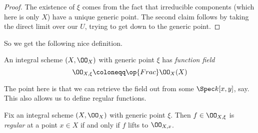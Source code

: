 \documentclass[../notes.tex]{subfiles}
\begin{document}
\begin{proof}
	The existence of $\xi$ comes from the fact that irreducible components (which here is only $X$) have a unique generic point. The second claim follows by taking the direct limit over our $U$, trying to get down to the generic point.
\end{proof}
So we get the following nice definition.
\begin{definition}
	An integral scheme $(X,\OO_X)$ with generic point $\xi$ has \textit{function field}
	\[\OO_{X,\xi}\coloneqq\op{Frac}\OO_X(X)\]
\end{definition}
The point here is that we can retrieve the field out from some $\Spec k[x,y]$, say. This also allows us to define regular functions.
\begin{definition}[Regular]
	Fix an integral scheme $(X,\OO_X)$ with generic point $\xi$. Then $f\in\OO_{X,\xi}$ is \textit{regular} at a point $x\in X$ if and only if $f$ lifts to $\OO_{X,x}$.
\end{definition}
\end{document}
